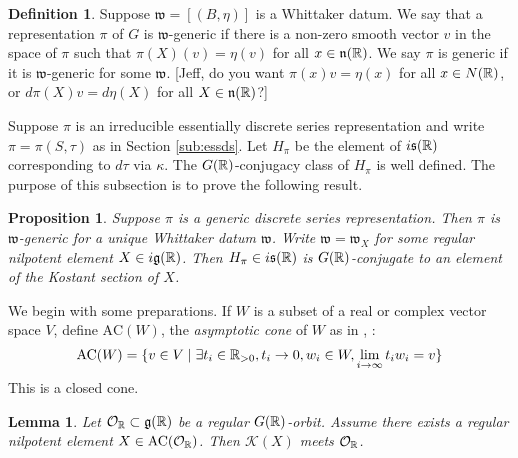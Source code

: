 \documentclass{article}
\newtheorem{lem}[thm]{Lemma}
\newtheorem{pro}[thm]{Proposition}
\theoremstyle{definition}
\newtheorem{dfn}[thm]{Definition}
\numberwithin{equation}{section}
\renewcommand{\-}{\hyp{}}
\newcommand{\warn}[1]{{\leavevmode\color{red}[#1]}}
\newcommand{\n}{\mathfrak n}
\newcommand{\s}{\mathfrak s}
\newcommand{\g}{\mathfrak g}
\renewcommand{\O}{\mathcal O}
\newcommand{\K}{\mathcal K}
\newcommand{\w}{\mathfrak w}
\newcommand{\AC}{\mathrm{AC}}
\begin{document}
\begin{dfn}
Suppose $\w=[(B,\eta)]$ is a Whittaker datum. We say that a representation $\pi$ of $G$ is $\w$-generic if there is a non-zero smooth vector $v$ in the space of $\pi$ such that $\pi(X)(v)=\eta(v)$ for all $x\in \n(\R)$. We say $\pi$ is generic if it is $\w$-generic for some $\w$. \warn{Jeff, do you want $\pi(x)v=\eta(x)$ for all $x \in N(\mathbb{R})$, or $d\pi(X)v=d\eta(X)$ for all $X \in \n(\R)$?}
\end{dfn}

Suppose $\pi$ is an irreducible essentially discrete series representation and write $\pi=\pi(S,\tau)$ as in Section  \ref{sub:essds}. Let $H_\pi$ be the element of $i\s(\R)$ corresponding to $d\tau$ via $\kappa$. The $G(\mathbb{R})$-conjugacy class of $H_\pi$ is well defined. The purpose of this subsection is to prove the following result.

	

\begin{pro}
  \label{p:whittaker}
Suppose $\pi$ is a generic discrete series representation. Then $\pi$ is $\w$-generic
for a unique Whittaker datum $\w$.
Write $\w=\w_X$ for some regular nilpotent element $X\in i\g(\R)$.
Then $H_\pi\in i\s(\R)$ is $G(\mathbb{R})$-conjugate to an element of the Kostant section of $X$.
\end{pro}

We begin with some preparations. If $W$ is a subset of a real or complex vector space $V$, define  $\AC(W)$,  the  {\it asymptotic cone} of $W$ as in   \cite[Proposition 3.7]{bvlocal}, \cite[Definition 2.9]{avav}:
$$
\AC(W)=\{v\in V\mid \exists t_i\in \R_{>0},t_i\rightarrow 0,w_i\in W,\lim_{i\rightarrow\infty}t_i w_i=v\}
$$
This is a closed cone. 

\begin{lem} \label{lem:g1}
Let $\O_\R\subset \g(\R)$ be a regular $G(\mathbb{R})$-orbit. Assume there exists a regular nilpotent element $X\in\AC(\O_\R)$. Then $\K(X)$ meets $\O_\R$.
\end{lem}
\end{document}
